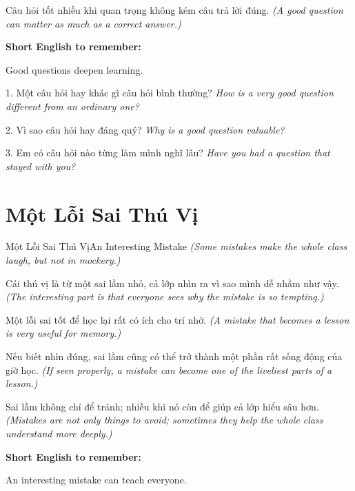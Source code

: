 \begin{baihoc}
Câu hỏi tốt nhiều khi quan trọng không kém câu trả lời đúng.
\textit{(A good question can matter as much as a correct answer.)}
\end{baihoc}

\begin{ghinhoanh}
\textbf{Short English to remember:}

Good questions deepen learning.

\end{ghinhoanh}

\begin{tuhocnhanh}
1. Một câu hỏi hay khác gì câu hỏi bình thường? \textit{How is a very good question different from an ordinary one?}

2. Vì sao câu hỏi hay đáng quý? \textit{Why is a good question valuable?}

3. Em có câu hỏi nào từng làm mình nghĩ lâu? \textit{Have you had a question that stayed with you?}
\end{tuhocnhanh}
\ngancach

\section{Một Lỗi Sai Thú Vị}
\begin{truyen}{Một Lỗi Sai Thú Vị}{An Interesting Mistake}
\textit{(Some mistakes make the whole class laugh, but not in mockery.)}

Cái thú vị là từ một sai lầm nhỏ, cả lớp nhìn ra vì sao mình dễ nhầm như vậy.
\textit{(The interesting part is that everyone sees why the mistake is so tempting.)}

Một lỗi sai tốt để học lại rất có ích cho trí nhớ.
\textit{(A mistake that becomes a lesson is very useful for memory.)}

Nếu biết nhìn đúng, sai lầm cũng có thể trở thành một phần rất sống động của giờ học.
\textit{(If seen properly, a mistake can become one of the liveliest parts of a lesson.)}
\end{truyen}

\begin{baihoc}
Sai lầm không chỉ để tránh; nhiều khi nó còn để giúp cả lớp hiểu sâu hơn.
\textit{(Mistakes are not only things to avoid; sometimes they help the whole class understand more deeply.)}
\end{baihoc}

\begin{ghinhoanh}
\textbf{Short English to remember:}

An interesting mistake can teach everyone.

\end{ghinhoanh}

